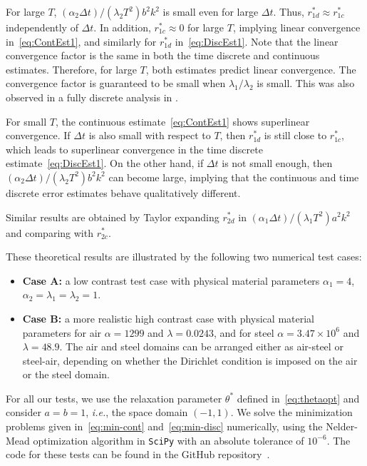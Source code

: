 \documentclass[reqno]{amsart}
\begin{document}
For large $T$, $(\alpha_2\Delta t)/(\lambda_2T^2) b^2 k^2$ is small even for large $\Delta t$. Thus, $r^*_{1d}\approx r^*_{1c}$ independently of $\Delta t$. In addition, $r^*_{1c}\approx 0$ for large $T$, implying linear convergence in~\eqref{eq:ContEst1}, and similarly for $r^*_{1d}$ in~\eqref{eq:DiscEst1}. Note that the linear convergence factor is the same in both the time discrete and continuous estimates. Therefore, for large $T$, both estimates predict linear convergence. The convergence factor is guaranteed to be small when $\lambda_1/\lambda_2$ is small. This was also observed in a fully discrete analysis in \cite{monbir:18}. 


For small $T$, the continuous estimate~\eqref{eq:ContEst1} shows superlinear convergence. 
If $\Delta t$ is also small with respect to $T$, then $r_{1d}^*$ is still close to $r_{1c}^*$, which leads to superlinear convergence in the time discrete estimate~\eqref{eq:DiscEst1}.
On the other hand, if $\Delta t$ is not small enough, then $(\alpha_2\Delta t)/(\lambda_2T^2) b^2 k^2$ can become large, implying that the continuous and time discrete error estimates behave qualitatively different. 


Similar results are obtained by Taylor expanding $r^*_{2d}$ in $(\alpha_1\Delta t)/(\lambda_1T^2) a^2 k^2$ and comparing with $r^*_{2c}$. 

These theoretical results are illustrated by the following two numerical test cases:
\begin{itemize}
	\item {\bf Case A:} a low contrast test case with physical material parameters $\alpha_1=4$, $\alpha_2=\lambda_1=\lambda_2=1$. 
	
	\item {\bf Case B:} a more realistic high contrast case with physical material parameters for air $\alpha = 1299$ and $\lambda = 0.0243$, and for steel $\alpha = 3.47 \times 10^6$ and $\lambda = 48.9$. The air and steel domains can be arranged either as air-steel or steel-air, depending on whether the Dirichlet condition is imposed on the air or the steel domain.
\end{itemize}
For all our tests, we use the relaxation parameter $\theta^*$ defined in~\eqref{eq:thetaopt} and consider $a = b = 1$, {\it i.e.}, the space domain $(-1, 1)$. We solve the minimization problems given in~\eqref{eq:min-cont} and~\eqref{eq:min-disc} numerically, using the Nelder-Mead optimization algorithm in {\tt SciPy} with an absolute tolerance of $10^{-6}$. The code for these tests can be found in the GitHub repository~\cite{code}.
\end{document}
